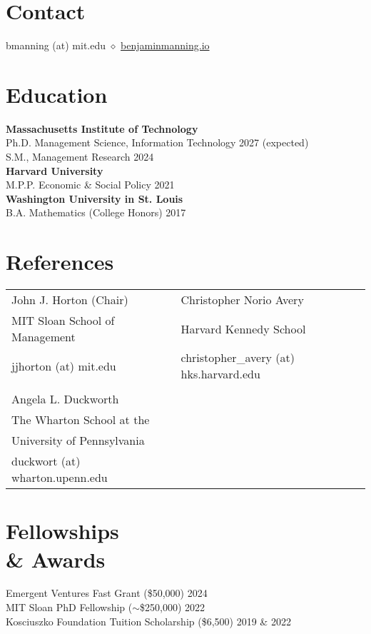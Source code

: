 \documentclass[margin,line,pifont,palatino,courier, 9pt]{res}
\begin{document}
\begin{resume}


\large


\section{\sc Contact}
bmanning (at) mit.edu $\diamond$ \href{https://benjaminmanning.io/}{benjaminmanning.io}

\section{\sc Education}
{\bf Massachusetts Institute of Technology}\\
Ph.D. Management Science, Information Technology \hfill 2027 (expected) \\
S.M., Management Research \hfill 2024\vspace{2mm}\\
{\bf Harvard University}\\
M.P.P. Economic \& Social Policy \hfill 2021\vspace{2mm}\\
{\bf Washington University in St. Louis}\\
B.A. Mathematics (College Honors) \hfill 2017

\section{\sc References}
\vspace{.15cm}
\begin{tabular}{@{}p{2.6in}p{2.75in}}
John J. Horton (Chair)& Christopher Norio Avery\\
MIT Sloan School of Management & Harvard Kennedy School \\
jjhorton (at) mit.edu & christopher\_avery (at) hks.harvard.edu\\
& \\
Angela L. Duckworth & \\
The Wharton School at the & \\
University of Pennsylvania & \\
duckwort (at) wharton.upenn.edu & \\
\end{tabular}

\section{\sc Fellowships \\ \& Awards}
Emergent Ventures Fast Grant (\$50,000) \hfill 2024 \\
MIT Sloan PhD Fellowship ($\sim$\$250,000) \hfill 2022 \\
Kosciuszko Foundation Tuition Scholarship (\$6,500) \hfill 2019 \& 2022 


\end{resume}
\end{document}
